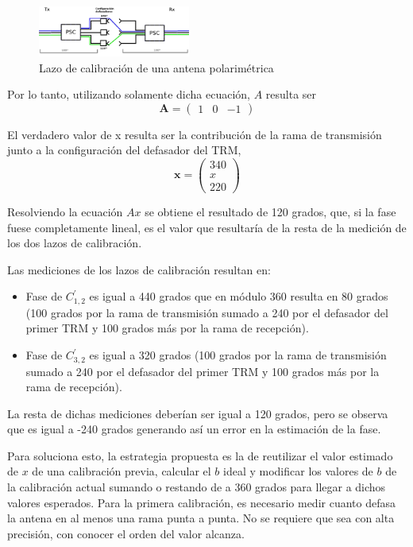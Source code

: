 \begin{figure}[H]
 \centering
 \includegraphics[width=5cm]{gfx/loopCal.png}
 \caption{Lazo de calibración de una antena polarimétrica}
 \label{fig:phaseDetermination}
\end{figure}

Por lo tanto, utilizando solamente dicha ecuación, $A$ resulta ser
$$
	\mathbf{A} = \begin{pmatrix} 1 & 0 & -1\end{pmatrix}
$$

El verdadero valor de x resulta ser la contribución de la rama de transmisión junto a la configuración del defasador del TRM, 
$$
	\mathbf{x} = \begin{pmatrix} 340 \\ x \\ 220\end{pmatrix}
$$

Resolviendo la ecuación $Ax$ se obtiene el resultado de 120 grados, que, si la fase fuese completamente lineal, es el valor 
que resultaría de la resta de la medición de los dos lazos de calibración.

Las mediciones de los lazos de calibración resultan en:
\begin{itemize}
	\item Fase de $C^{'}_{1,2}$ es igual a 440 grados que en módulo 360 resulta en 80 grados (100 grados por la rama de 
		transmisión sumado a 240 por el defasador del primer TRM y 100 grados más por la rama de recepción).
	\item Fase de $C^{'}_{3, 2}$ es igual a 320 grados (100 grados por la rama de transmisión sumado a 240 por el defasador 
		del primer TRM y 100 grados más por la rama de recepción). 
\end{itemize}

La resta de dichas mediciones deberían ser igual a 120 grados, pero se observa que es igual a -240 grados generando así un 
error en la estimación de la fase.

Para soluciona esto, la estrategia propuesta es la de reutilizar el valor estimado de $x$ de una calibración previa, calcular 
el $b$ ideal y modificar los valores de $b$ de la calibración actual sumando o restando de a 360 grados para llegar a dichos 
valores esperados. Para la primera calibración, es necesario medir cuanto defasa la antena en al menos una rama punta a punta. 
No se requiere que sea con alta precisión, con conocer el orden del valor alcanza. 

